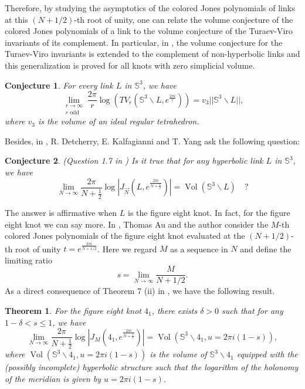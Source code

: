 \documentclass[10pt,a4paper]{article}
\newcommand{\lt}{\left}
\newcommand{\rt}{\right}
\def\Vol{\operatorname{Vol}}
\newtheorem{conjecture}{Conjecture}
\newtheorem{theorem}{Theorem}
\def\SS{{\mathbb S}}
\def\Vol{\operatorname{Vol}}
\begin{document}
Therefore, by studying the asymptotics of the colored Jones polynomials of links at this $(N+1/2)$-th root of unity, one can relate the volume conjecture of the colored Jones polynomials of a link to the volume conjecture of the Turaev-Viro invariants of its complement. In particular, in \cite{DKY17}, the volume conjecture for the Turaev-Viro invariants is extended to the complement of non-hyperbolic links and this generalization is proved for all knots with zero simplicial volume. 

\begin{conjecture}\label{tvGM}\cite{DKY17}
For every link $L$ in $\SS^3$, we have
$$  \lim_{\substack{ r\to \infty \\r \text{ odd}}} \frac{2\pi }{r} \log(TV_r(\SS^3 \backslash L, e^{\frac{2\pi i}{r}})) = v_3 ||\SS^3 \backslash L||,$$
where $v_3$ is the volume of an ideal regular tetrahedron.
\end{conjecture}

Besides, in \cite{DKY17}, R. Detcherry, E. Kalfagianni and T. Yang ask the following question:
\begin{conjecture}\label{sVC}(Question 1.7 in \cite{DKY17}) Is it true that for any hyperbolic link $L$ in $\SS^3$, we have
$$ \lim_{N\to \infty} \frac{2\pi}{N+\frac{1}{2}} \log|J_{\vec{N}}(L,e^{\frac{2\pi i}{N+\frac{1}{2}}}) | = \Vol(\SS^3 \backslash L) \quad ?$$
\end{conjecture}
The answer is affirmative when $L$ is the figure eight knot. In fact, for the figure eight knot we can say more. In \cite{WA17}, Thomas Au and the author consider the $M$-th colored Jones polynomials of the figure eight knot evaluated at the $(N+1/2)$-th root of unity $t=e^{\frac{2\pi i}{N+1/2}}$. Here we regard $M$ as a sequence in $N$ and define the limiting ratio 
$$ s = \lim_{N \to \infty} \frac{M}{N+1/2}.$$
As a direct consequence of Theorem 7 (ii) in \cite{WA17}, we have the following result.
\begin{theorem}\cite{WA17}\label{WAthm} For the figure eight knot $4_1$, there exists $\delta > 0 $ such that for any $1-\delta < s \leq 1$, we have
$$ \lim_{N \to \infty} \frac{2\pi }{N+\frac{1}{2}}\log|J_M(4_1, e^{\frac{2\pi i}{N+\frac{1}{2}}}) | =  \Vol\lt(\SS^3 \backslash 4_1, u = 2\pi i (1 - s)\rt), $$ 
where $ \Vol\lt(\SS^3 \backslash 4_1, u = 2\pi i (1 - s)\rt)$ is the volume of $\SS^3 \backslash 4_1$ equipped with the (possibly incomplete) hyperbolic structure such that the logarithm of the holonomy of the meridian is given by $u = 2\pi i (1-s)$.
\end{theorem}
\end{document}
